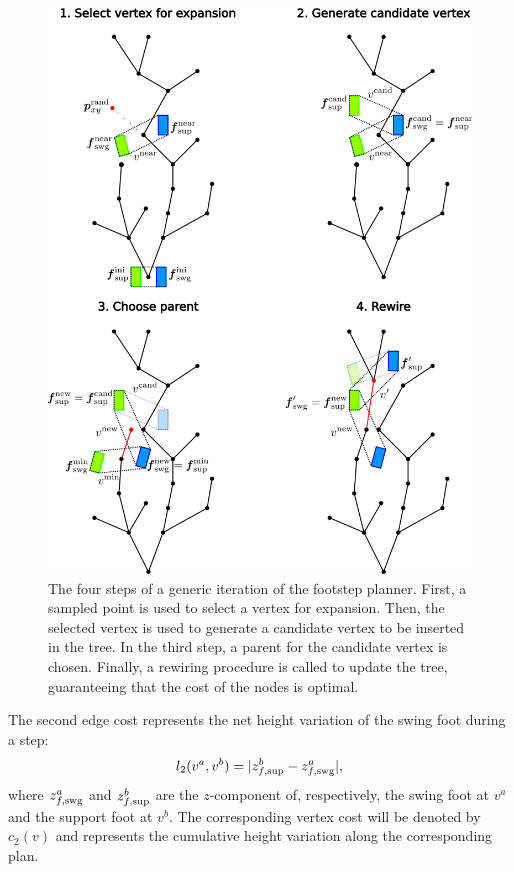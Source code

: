 \begin{figure}
\centering
\includegraphics[width=\textwidth]{figures/FootstepPlanner.pdf}
\caption{The four steps of a generic iteration of the footstep planner.
First, a sampled point is used to select a vertex for expansion.
Then, the selected vertex is used to generate a candidate vertex to be inserted in the tree.
In the third step, a parent for the candidate vertex is chosen.
Finally, a rewiring procedure is called to update the tree, guaranteeing that the cost of the nodes is optimal.}
\label{fig:WoS:FootstepPlanner}
\end{figure}   
    
The second edge cost represents the net height variation of the swing foot during a step:
\begin{equation}
l_2(v^a, v^b) = |z^b_{f, {\rm sup}} - z^a_{f, {\rm swg}}|,
\label{eq:WoS:costHeight}
\end{equation}
where $z^a_{f, {\rm swg}}$ and $z^b_{f, {\rm sup}}$ are the $z$-component of, respectively, the swing foot at $v^a$ and the support foot at $v^b$.  The corresponding vertex cost will be denoted by $c_2(v)$ and represents the cumulative height variation along the corresponding plan. 
    
